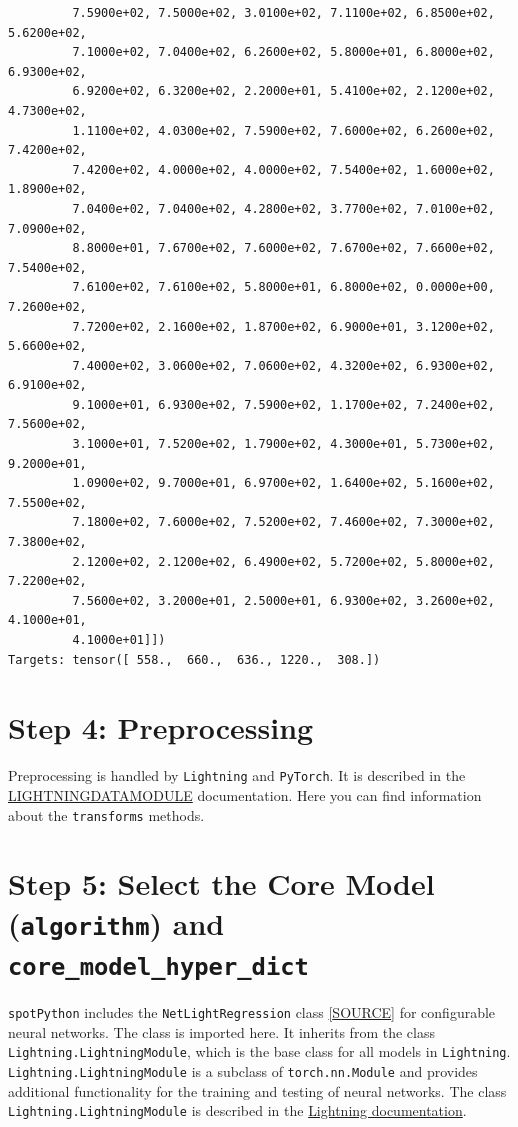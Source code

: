 \documentclass[
  letterpaper,
  DIV=11,
  numbers=noendperiod]{scrreprt}
\begin{document}
\begin{tcolorbox}
\begin{verbatim}
         7.5900e+02, 7.5000e+02, 3.0100e+02, 7.1100e+02, 6.8500e+02, 5.6200e+02,
         7.1000e+02, 7.0400e+02, 6.2600e+02, 5.8000e+01, 6.8000e+02, 6.9300e+02,
         6.9200e+02, 6.3200e+02, 2.2000e+01, 5.4100e+02, 2.1200e+02, 4.7300e+02,
         1.1100e+02, 4.0300e+02, 7.5900e+02, 7.6000e+02, 6.2600e+02, 7.4200e+02,
         7.4200e+02, 4.0000e+02, 4.0000e+02, 7.5400e+02, 1.6000e+02, 1.8900e+02,
         7.0400e+02, 7.0400e+02, 4.2800e+02, 3.7700e+02, 7.0100e+02, 7.0900e+02,
         8.8000e+01, 7.6700e+02, 7.6000e+02, 7.6700e+02, 7.6600e+02, 7.5400e+02,
         7.6100e+02, 7.6100e+02, 5.8000e+01, 6.8000e+02, 0.0000e+00, 7.2600e+02,
         7.7200e+02, 2.1600e+02, 1.8700e+02, 6.9000e+01, 3.1200e+02, 5.6600e+02,
         7.4000e+02, 3.0600e+02, 7.0600e+02, 4.3200e+02, 6.9300e+02, 6.9100e+02,
         9.1000e+01, 6.9300e+02, 7.5900e+02, 1.1700e+02, 7.2400e+02, 7.5600e+02,
         3.1000e+01, 7.5200e+02, 1.7900e+02, 4.3000e+01, 5.7300e+02, 9.2000e+01,
         1.0900e+02, 9.7000e+01, 6.9700e+02, 1.6400e+02, 5.1600e+02, 7.5500e+02,
         7.1800e+02, 7.6000e+02, 7.5200e+02, 7.4600e+02, 7.3000e+02, 7.3800e+02,
         2.1200e+02, 2.1200e+02, 6.4900e+02, 5.7200e+02, 5.8000e+02, 7.2200e+02,
         7.5600e+02, 3.2000e+01, 2.5000e+01, 6.9300e+02, 3.2600e+02, 4.1000e+01,
         4.1000e+01]])
Targets: tensor([ 558.,  660.,  636., 1220.,  308.])
\end{verbatim}

\end{tcolorbox}

\section{Step 4: Preprocessing}\label{sec-preprocessing-33}

Preprocessing is handled by \texttt{Lightning} and \texttt{PyTorch}. It
is described in the
\href{https://lightning.ai/docs/pytorch/stable/data/datamodule.html}{LIGHTNINGDATAMODULE}
documentation. Here you can find information about the
\texttt{transforms} methods.

\section{\texorpdfstring{Step 5: Select the Core Model
(\texttt{algorithm}) and
\texttt{core\_model\_hyper\_dict}}{Step 5: Select the Core Model (algorithm) and core\_model\_hyper\_dict}}\label{sec-selection-of-the-algorithm-33}

\texttt{spotPython} includes the \texttt{NetLightRegression} class
\href{https://github.com/sequential-parameter-optimization/spotPython/blob/main/src/spotPython/light/netlightregression.py}{{[}SOURCE{]}}
for configurable neural networks. The class is imported here. It
inherits from the class \texttt{Lightning.LightningModule}, which is the
base class for all models in \texttt{Lightning}.
\texttt{Lightning.LightningModule} is a subclass of
\texttt{torch.nn.Module} and provides additional functionality for the
training and testing of neural networks. The class
\texttt{Lightning.LightningModule} is described in the
\href{https://lightning.ai/docs/pytorch/stable/common/lightning_module.html}{Lightning
documentation}.
\end{document}
